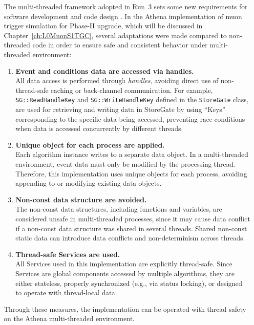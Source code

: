 The multi-threaded framework adopted in Run~3 sets some new requirements for software development and code design \cite{ATLAScomputing2025}. In the Athena implementation of muon trigger simulation for Phase-II upgrade, which will be discussed in Chapter~\ref{ch:L0MuonS1TGC}, several adaptations were made compared to non-threaded code in order to ensure safe and consistent behavior under multi-threaded environment:

\begin{enumerate}
  \item \textbf{Event and conditions data are accessed via handles.} \\
  All data access is performed through \textit{handles}, avoiding direct use of non-thread-safe caching or back-channel communication. For example, \texttt{SG::ReadHandleKey} and \texttt{SG::WriteHandleKey} defined in the \texttt{StoreGate} class, are used for retrieving and writing data in StoreGate by using ``Keys'' corresponding to the specific data being accessed, preventing race conditions when data is accessed concurrently by different threads.
  
  \item \textbf{Unique object for each process are applied.} \\
  Each algorithm instance writes to a separate data object. In a multi-threaded environment, event data must only be modified by the processing thread. Therefore, this implementation uses unique objects for each process, avoiding appending to or modifying existing data objects.
  
  \item \textbf{Non-const data structure are avoided.} \\
  The non-const data structures, including functions and variables, are considered unsafe in multi-threaded processes, since it may cause data conflict if a non-const data structure was shared in several threads. Shared non-const static data can introduce data conflicts and non-determinism across threads.
  
  \item \textbf{Thread-safe Services are used.} \\
  All Services used in this implementation are explicitly thread-safe. Since Services are global components accessed by multiple algorithms, they are either stateless, properly synchronized (e.g., via status locking), or designed to operate with thread-local data.
\end{enumerate}

Through these measures, the implementation can be operated with thread safety on the Athena multi-threaded environment.